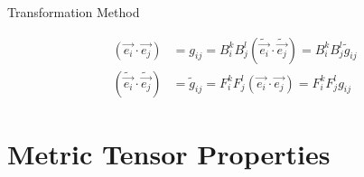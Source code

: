 \documentclass{article}
\begin{document}
	\begin{mybox}{Transformation Method \emph{}}
		\begin{center}
			\begin{align*}
				(\overrightarrow{e_{i}}\cdot \overrightarrow{e_{j}}) &= g_{ij} = B^{k}_{i}B^{l}_{j}(\widetilde{\overrightarrow{e_{i}}}\cdot \widetilde{\overrightarrow{e_{j}}}) = B^{k}_{i}B^{l}_{j}\widetilde{g}_{ij}\\
				(\widetilde{\overrightarrow{e_{i}}}\cdot \widetilde{\overrightarrow{e_{j}}}) &= \widetilde{g}_{ij} = F^{k}_{i}F^{l}_{j}(\overrightarrow{e_{i}}\cdot \overrightarrow{e_{j}}) = F^{k}_{i}F^{l}_{j}g_{ij}
			\end{align*}
		\end{center}
	\end{mybox}

	\section*{Metric Tensor Properties}
	
\end{document}
